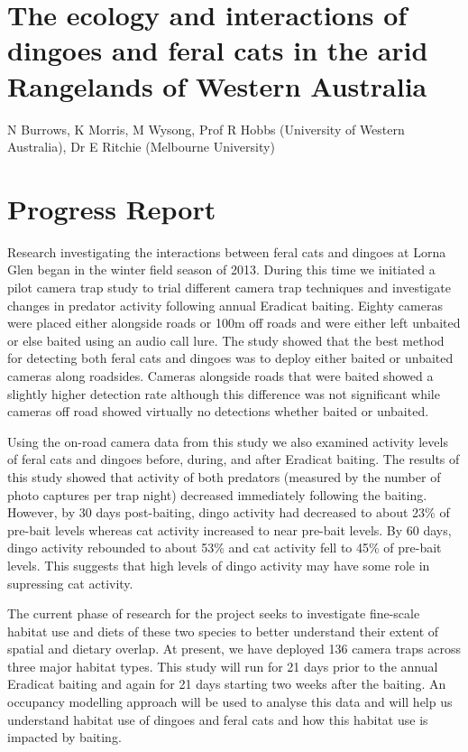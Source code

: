 \documentclass[version=last, 
    paper=a4, %
    10pt, %
    usenames,
    dvipsnames, 
    oneside, %
    headings=openany, %
    DIV=15 %
]{scrbook}
\begin{document}
\section*{The ecology and interactions of dingoes and feral cats in the arid
Rangelands of Western Australia
}

N Burrows, K Morris, M Wysong, Prof R Hobbs (University of Western
Australia), Dr E Ritchie (Melbourne University)


\section*{Progress Report}
Research investigating the interactions between feral cats and dingoes
at Lorna Glen began in the winter field season of 2013. During this time
we initiated a pilot camera trap study to trial different camera trap
techniques and investigate changes in predator activity following annual
Eradicat baiting. Eighty cameras were placed either alongside roads or
100m off roads and were either left unbaited or else baited using an
audio call lure. The study showed that the best method for detecting
both feral cats and dingoes was to deploy either baited or unbaited
cameras along roadsides. Cameras alongside roads that were baited showed
a slightly higher detection rate although this difference was not
significant while cameras off road showed virtually no detections
whether baited or unbaited.

Using the on-road camera data from this study we also examined activity
levels of feral cats and dingoes before, during, and after Eradicat
baiting. The results of this study showed that activity of both
predators (measured by the number of photo captures per trap night)
decreased immediately following the baiting. However, by 30 days
post-baiting, dingo activity had decreased to about 23\% of pre-bait
levels whereas cat activity increased to near pre-bait levels. By 60
days, dingo activity rebounded to about 53\% and cat activity fell to
45\% of pre-bait levels. This suggests that high levels of dingo
activity may have some role in supressing cat activity.

The current phase of research for the project seeks to investigate
fine-scale habitat use and diets of these two species to better
understand their extent of spatial and dietary overlap. At present, we
have deployed 136 camera traps across three major habitat types. This
study will run for 21 days prior to the annual Eradicat baiting and
again for 21 days starting two weeks after the baiting. An occupancy
modelling approach will be used to analyse this data and will help us
understand habitat use of dingoes and feral cats and how this habitat
use is impacted by baiting.
\end{document}
